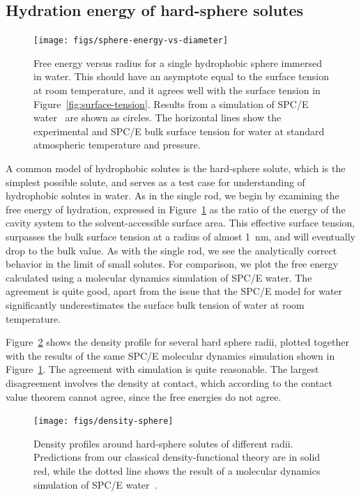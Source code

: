 \documentclass[letterpaper,twocolumn,amsmath,amssymb,prb]{revtex4-1}
\begin{document}
\subsection{Hydration energy of hard-sphere solutes}

\begin{figure}
\begin{center}
\texttt{[image: figs/sphere-energy-vs-diameter]}
\end{center}
\caption{ Free energy versus radius for a single hydrophobic sphere
  immersed in water. This should have an asymptote equal to the
  surface tension at room temperature, and it agrees well with the
  surface tension in Figure~\ref{fig:surface-tension}. Results from a
  simulation of SPC/E water~\cite{huang2001shs} are shown as circles.
  The horizontal lines show the experimental and SPC/E bulk surface
  tension for water at standard atmospheric temperature and
  pressure. }
\label{fig:sphere-energy-vs-diameter}
\end{figure}

A common model of hydrophobic solutes is the hard-sphere solute, which
is the simplest possible solute, and serves as a test case for
understanding of hydrophobic solutes in
water\cite{sedlmeier2011entropy}.  As in the single rod, we begin by
examining the free energy of hydration, expressed in
Figure~\ref{fig:sphere-energy-vs-diameter} as the ratio of the energy
of the cavity system to the solvent-accessible surface area.  This
effective surface tension, surpasses the bulk surface tension at a
radius of almost 1~nm, and will eventually drop to the bulk value.  As
with the single rod, we see the analytically correct behavior in the
limit of small solutes.  For comparison, we plot the free energy
calculated using a molecular dynamics simulation of SPC/E
water\cite{huang2001shs}.  The agreement is quite good, apart from the
issue that the SPC/E model for water significantly underestimates the
surface bulk tension of water at room
temperature\cite{vega2007surface}.

Figure~\ref{fig:density-sphere} shows the density profile for several
hard sphere radii, plotted together with the results of the same
SPC/E molecular dynamics simulation shown in
Figure~\ref{fig:sphere-energy-vs-diameter}\cite{huang2001shs}.  The
agreement with simulation is quite reasonable.  The largest
disagreement involves the density at contact, which according to the
contact value theorem cannot agree, since the free energies do not
agree.

\begin{figure}
\begin{center}
\texttt{[image: figs/density-sphere]}
\end{center}
\caption{ Density profiles around hard-sphere solutes of different radii. Predictions
  from our classical density-functional theory are in solid red, while
  the dotted line shows the result of a molecular dynamics simulation
  of SPC/E water~\cite{huang2001shs}.  }
\label{fig:density-sphere}
\end{figure}
\end{document}
